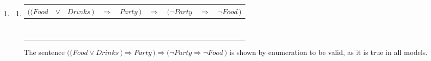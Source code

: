 \begin{enumerate}
\item
\begin{enumerate}
\item
\begin{tabular}{ccccc|c|ccc}
$\big(\big(\textit{Food}$ & $\lor$ & $\textit{Drinks}\,\big)$ & $\Rightarrow$ & $\textit{Party}\,\big)$ & $\Rightarrow$ & $\big(\neg \textit{Party}$ & $\Rightarrow$ & $\neg \textit{Food}\,\big)$ \\
\hline
\F                        & \F     & \F                       & \T            & \F                      & \T            & \T                         & \T            & \T                          \\
\F                        & \F     & \F                       & \T            & \T                      & \T            & \F                         & \T            & \T                          \\
\F                        & \T     & \T                       & \F            & \F                      & \T            & \T                         & \T            & \T                          \\
\F                        & \T     & \T                       & \T            & \T                      & \T            & \F                         & \T            & \T                          \\
\T                        & \T     & \F                       & \F            & \F                      & \T            & \T                         & \F            & \F                          \\
\T                        & \T     & \F                       & \T            & \T                      & \T            & \F                         & \T            & \F                          \\
\T                        & \T     & \T                       & \F            & \F                      & \T            & \T                         & \F            & \F                          \\
\T                        & \T     & \T                       & \T            & \T                      & \T            & \F                         & \T            & \F                          \\
\end{tabular}

The sentence $\big(\big(\textit{Food} \lor \textit{Drinks}\,\big) \Rightarrow \textit{Party}\,\big) \Rightarrow \big(\neg \textit{Party} \Rightarrow \neg \textit{Food}\,\big)$ is shown by enumeration to be valid, as it is true in all models.


\end{enumerate}
\end{enumerate}
